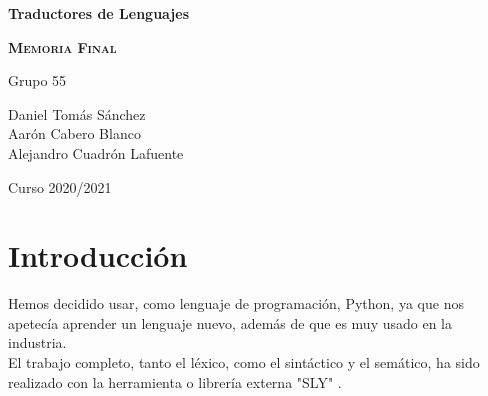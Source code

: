\documentclass[11pt, , a4paper, titlepage]{article}
\begin{document}
\begin{titlepage}
    \begin{center}
        \hrulefill

        \vspace{0.5cm}
        {\bfseries\Huge Traductores de Lenguajes \par}
        \vspace{3cm}

        {\scshape \LARGE \textbf{Memoria Final}}

        \hrulefill

        \vspace{2.0cm}
    \end{center}

    \centering


    \Large{Grupo 55}\\
    \vspace{0.3cm}

    {\large Daniel Tomás Sánchez\\ Aarón Cabero Blanco\\ Alejandro Cuadrón Lafuente\par}

    \vspace{2cm}
    {\Large Curso 2020/2021 \par}
\end{titlepage}


\tableofcontents
\clearpage


\section{Introducción}
Hemos decidido usar, como lenguaje de programación, Python, ya que nos apetecía aprender un lenguaje nuevo, además de que es muy usado en la industria.\\
El trabajo completo, tanto el léxico, como el sintáctico y el semático, ha sido realizado con la herramienta o librería externa "SLY" \cite{SLY}.\\
\end{document}
